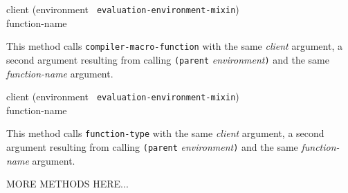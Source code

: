{\small{} {client (environment {\tt
      evaluation-environment-mixin}) \\ function-name}
}

This method calls \texttt{compiler-macro-function} with the same
\textit{client} argument, a second argument resulting from calling
\texttt{(parent} \textit{environment}\texttt{)} and the same
  \textit{function-name} argument.

{\small{} {client (environment {\tt
      evaluation-environment-mixin}) \\ function-name}
}

This method calls \texttt{function-type} with the same \textit{client}
argument, a second argument resulting from calling \texttt{(parent}
\textit{environment}\texttt{)} and the same \textit{function-name}
argument.

MORE METHODS HERE...
